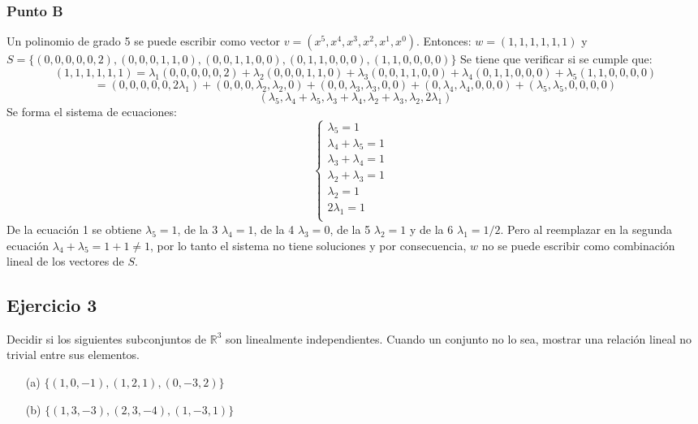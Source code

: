 \documentclass[a4paper,12pt]{article}
\begin{document}
\subsubsection{Punto B}
Un polinomio de grado 5 se puede escribir como vector $v=(x^5,x^4,x^3,x^2,x^1,x^0)$. Entonces: \newline
$w=(1,1,1,1,1,1)$ y $S=\{ (0,0,0,0,0,2),(0,0,0,1,1,0),(0,0,1,1,0,0),(0,1,1,0,0,0),(1,1,0,0,0,0)\}$ \newline
Se tiene que verificar si se cumple que:
$$
(1,1,1,1,1,1) = \lambda_1(0,0,0,0,0,2)+\lambda_2(0,0,0,1,1,0)+\lambda_3(0,0,1,1,0,0)+\lambda_4(0,1,1,0,0,0)+\lambda_5(1,1,0,0,0,0)
$$ 
$$
= (0,0,0,0,0,2\lambda_1) + (0,0,0,\lambda_2,\lambda_2,0) + (0,0,\lambda_3,\lambda_3,0,0) + (0,\lambda_4,\lambda_4,0,0,0) + (\lambda_5,\lambda_5,0,0,0,0)
$$
$$
(\lambda_5,\lambda_4+\lambda_5,\lambda_3+\lambda_4,\lambda_2+\lambda_3,\lambda_2,2\lambda_1)
$$
Se forma el sistema de ecuaciones:
$$
\begin{cases}
\lambda_5 = 1 & \\ 
\lambda_4+\lambda_5 = 1 & \\ 
\lambda_3+\lambda_4 = 1 & \\ 
\lambda_2+\lambda_3 = 1 & \\
\lambda_2 = 1 & \\
2\lambda_1 = 1 \\
\end{cases}
$$
De la ecuación 1 se obtiene $\lambda_5=1$, de la 3 $\lambda_4=1$, de la 4 $\lambda_3=0$, de la 5 $\lambda_2=1$ y de la 6 $\lambda_1=1/2$. Pero al reemplazar en la segunda ecuación $\lambda_4+\lambda_5=1+1\neq 1$, por lo tanto el sistema no tiene soluciones y por consecuencia, $w$ no se puede escribir como combinación lineal de los vectores de $S$.
\subsection{Ejercicio 3}
Decidir si los siguientes subconjuntos de $\mathds{R}^3$ son linealmente independientes. Cuando un conjunto no lo sea, mostrar una relación lineal no trivial entre sus elementos.
\begin{itemize}
    \item[(a)] $\{ (1,0,-1),(1,2,1), (0,-3,2) \}$
    \item[(b)] $\{ (1,3,-3),(2,3,-4), (1,-3,1) \}$
\end{itemize}
\end{document}
